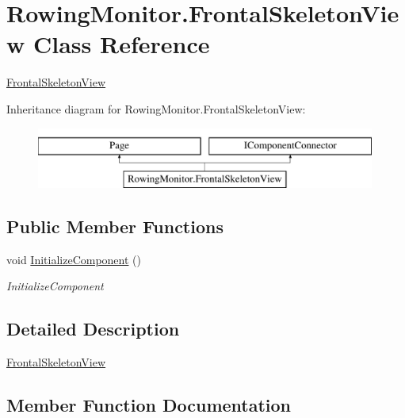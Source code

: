 \hypertarget{class_rowing_monitor_1_1_frontal_skeleton_view}{}\section{Rowing\+Monitor.\+Frontal\+Skeleton\+View Class Reference}
\label{class_rowing_monitor_1_1_frontal_skeleton_view}


\hyperlink{class_rowing_monitor_1_1_frontal_skeleton_view}{Frontal\+Skeleton\+View}  


Inheritance diagram for Rowing\+Monitor.\+Frontal\+Skeleton\+View\+:\begin{figure}[H]
\begin{center}
\leavevmode
\includegraphics[height=2.000000cm]{class_rowing_monitor_1_1_frontal_skeleton_view}
\end{center}
\end{figure}
\subsection*{Public Member Functions}
\begin{DoxyCompactItemize}
\item 
void \hyperlink{class_rowing_monitor_1_1_frontal_skeleton_view_a201294a5b785283d5d71eeb51a5ad112}{Initialize\+Component} ()
\begin{DoxyCompactList}\small\item\em Initialize\+Component \end{DoxyCompactList}\end{DoxyCompactItemize}


\subsection{Detailed Description}
\hyperlink{class_rowing_monitor_1_1_frontal_skeleton_view}{Frontal\+Skeleton\+View} 



\subsection{Member Function Documentation}
\mbox{\label{class_rowing_monitor_1_1_frontal_skeleton_view_a201294a5b785283d5d71eeb51a5ad112}} 
